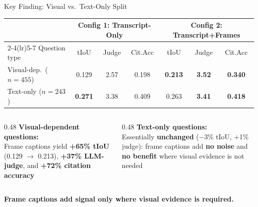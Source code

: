 \documentclass[aspectratio=169,t]{beamer}
\begin{document}
\begin{frame}{Key Finding: Visual vs.\ Text-Only Split}

\begin{center}
\small
\begin{tabular}{lcccccc}
\toprule
 & \multicolumn{3}{c}{\textbf{Config 1: Transcript-Only}}
 & \multicolumn{3}{c}{\textbf{Config 2: Transcript+Frames}} \\
\cmidrule(lr){2-4}\cmidrule(lr){5-7}
Question type & tIoU & Judge & Cit.Acc & tIoU & Judge & Cit.Acc \\
\midrule
Visual-dep.\ ($n=455$) & 0.129 & 2.57 & 0.198
                        & \cellcolor{green!20}\textbf{0.213} & \cellcolor{green!20}\textbf{3.52} & \cellcolor{green!20}\textbf{0.340} \\
Text-only ($n=243$)    & \textbf{0.271} & 3.38 & 0.409
                        & 0.263 & \textbf{3.41} & \textbf{0.418} \\
\bottomrule
\end{tabular}
\end{center}

\bigskip
\begin{columns}[T]
\begin{column}{0.48\textwidth}
  \textbf{Visual-dependent questions:}\\
  Frame captions yield \textbf{+65\% tIoU} (0.129 $\to$ 0.213),
  \textbf{+37\% LLM-judge}, and \textbf{+72\% citation accuracy}
\end{column}
\begin{column}{0.48\textwidth}
  \textbf{Text-only questions:}\\
  Essentially \textbf{unchanged} ($-$3\% tIoU, $+$1\% judge):
  frame captions add \textbf{no noise} and \textbf{no benefit}
  where visual evidence is not needed
\end{column}
\end{columns}

\medskip
\begin{center}
\textbf{\large Frame captions add signal only where visual evidence is required.}
\end{center}

\end{frame}
\end{document}
